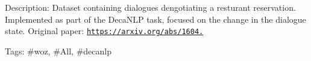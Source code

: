 Description\+: Dataset containing dialogues dengotiating a resturant reservation. Implemented as part of the Deca\+N\+LP task, focused on the change in the dialogue state. Original paper\+: \href{https://arxiv.org/abs/1604.04562}{\tt https\+://arxiv.\+org/abs/1604.}

Tags\+: \#woz, \#\+All, \#decanlp 